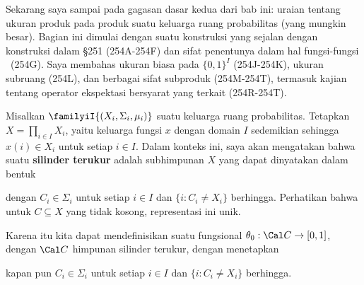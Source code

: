 
\def\chaptername{Ukuran produk}
\def\sectionname{Produk tak hingga}


Sekarang saya sampai pada gagasan dasar kedua dari
bab ini: uraian tentang ukuran produk pada produk suatu
keluarga ruang probabilitas (yang mungkin besar). Bagian ini dimulai dengan
suatu konstruksi yang sejalan dengan konstruksi dalam \S251 (254A-254F) dan
sifat penentunya dalam hal fungsi-fungsi \imp\ (254G). Saya membahas
ukuran biasa pada $\{0,1\}^I$
(254J-254K), ukuran subruang (254L), dan berbagai sifat
subproduk (254M-254T), termasuk kajian tentang operator ekspektasi
bersyarat yang terkait (254R-254T).

 Misalkan $\familyiI{(X_i,\Sigma_i,\mu_i)}$ suatu
keluarga ruang
probabilitas. Tetapkan $X=\prod_{i\in I}X_i$, yaitu keluarga fungsi $x$ dengan
domain $I$ sedemikian sehingga $x(i)\in X_i$ untuk setiap $i\in I$. Dalam
konteks ini, saya akan mengatakan bahwa suatu {\bf silinder terukur} adalah subhimpunan $X$
yang dapat dinyatakan dalam bentuk


\noindent dengan $C_i\in\Sigma_i$ untuk setiap $i\in I$ dan
$\{i:C_i\ne X_i\}$ berhingga. Perhatikan bahwa untuk $C\subseteq X$ yang
tidak kosong, representasi ini unik. 

 Karena itu kita dapat mendefinisikan suatu fungsional
$\theta_0:\Cal C\to[0,1]$, dengan $\Cal C$ himpunan silinder
terukur, dengan menetapkan


\noindent kapan pun $C_i\in\Sigma_i$ untuk setiap $i\in I$ dan
$\{i:C_i\ne X_i\}$ berhingga.

